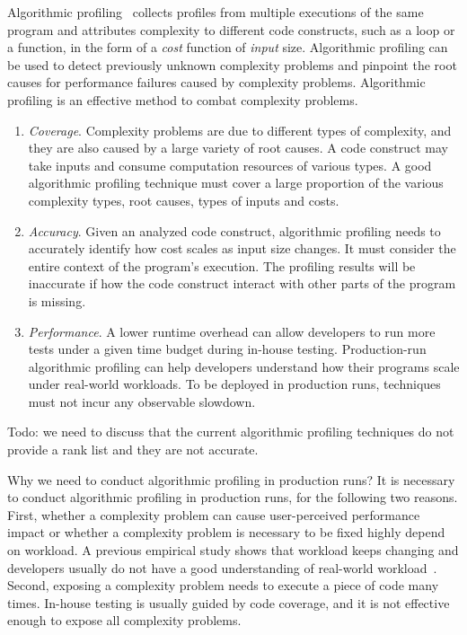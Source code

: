 
Algorithmic profiling~\cite{Aprof1,Aprof2,AlgoProf} collects profiles from multiple
executions of the same program and attributes complexity to different code constructs, such as a loop or a function,
in the form of a \textit{cost} function of \textit{input} size.
Algorithmic profiling can be used to detect previously unknown complexity problems and
pinpoint the root causes for performance failures caused by complexity problems.
Algorithmic profiling is an effective method to combat complexity problems. 




\begin{enumerate}

\item \textit{Coverage}. Complexity problems are due to different types of complexity,
and they are also caused by a large variety of root causes.
A code construct may take inputs and
consume computation resources of various types.
A good algorithmic profiling technique must cover a
large proportion of the various complexity types, root causes, types of inputs and costs.


\item \textit{Accuracy}.
Given an analyzed code construct,
algorithmic profiling needs to accurately identify
how cost scales as input size changes.
It must consider the entire context of the program's execution.
The profiling results will be inaccurate if how the code construct interact with other parts of the program is missing.

\item \textit{Performance}.
A lower runtime overhead can allow developers to run more tests
under a given time budget during in-house testing.
Production-run algorithmic profiling can help developers
understand how their programs scale
under real-world workloads.
To be deployed in production runs,
techniques must not incur any observable slowdown.


\end{enumerate}



{\color{red} Todo: we need to discuss that the current algorithmic profiling techniques do not provide a rank list
and they are not accurate. }

{\color{red} Why we need to conduct algorithmic profiling in production runs?}
It is necessary to conduct algorithmic profiling in production runs, 
for the following two reasons. 
First, whether a complexity problem can 
cause user-perceived performance 
impact or whether a complexity problem is necessary to be fixed 
highly depend on workload. 
A previous empirical study shows that workload keeps changing and 
developers usually do not have a good understanding of 
real-world workload~\citep{PerfBug}. 
Second, exposing a complexity problem needs to 
execute a piece of code many times. 
In-house testing is usually guided by code coverage, 
and it is not effective enough to expose all complexity problems. 


